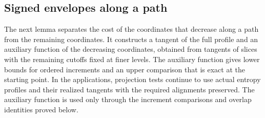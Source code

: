 \subsection{Signed envelopes along a path}

The next lemma separates the cost of the coordinates that decrease
along a path from the remaining coordinates. It constructs a tangent
of the full profile and an auxiliary function of the decreasing
coordinates, obtained from tangents of slices with the remaining
cutoffs fixed at finer levels. The auxiliary function gives lower
bounds for ordered increments and an upper comparison that is exact
at the starting point. In the applications, projection tests continue
to use actual entropy profiles and their realized tangents with the
required alignments preserved. The auxiliary function is used only
through the increment comparisons and overlap identities proved below.

